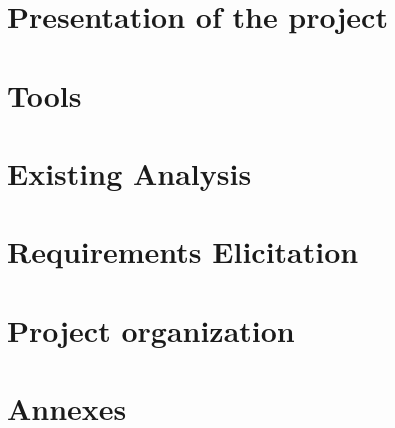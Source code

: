 \documentclass{report}
\begin{document}



 
\tableofcontents

\newpage


\chapter{Presentation of the project}


\chapter{Tools}


\chapter{Existing Analysis}


\chapter{Requirements Elicitation}


\chapter{Project organization}


\nocite{*}


\pagebreak

\chapter{Annexes}

\end{document}
